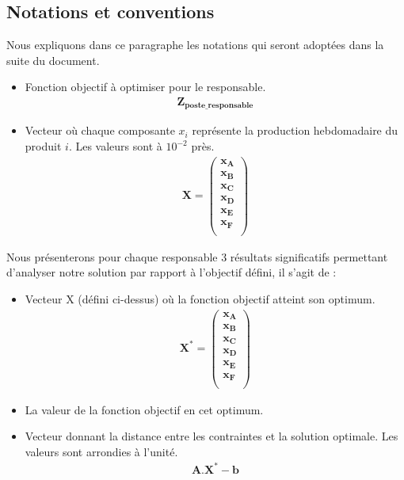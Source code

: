 \documentclass[12pt]{article}
\begin{document}
\subsection{Notations et conventions}
Nous expliquons dans ce paragraphe les notations qui seront adoptées dans la suite du document.
\begin{itemize}
\item Fonction objectif à optimiser pour le responsable.
\begin{align*} 
	\boldsymbol{Z_{poste\_responsable}}
\end{align*}
\item Vecteur où chaque composante $x_{i}$ représente la production hebdomadaire du produit $i$. Les valeurs sont à $10^{-2}$ près.
\begin{align*} 
	\boldsymbol{X = 
   \left (
   \begin{array}{c}
      x_{A} \\
      x_{B} \\
      x_{C} \\
      x_{D} \\
      x_{E} \\
      x_{F} \\
   \end{array}
   \right )}
\end{align*}
\end{itemize}
Nous présenterons pour chaque responsable 3 résultats significatifs permettant d'analyser notre solution par rapport à l'objectif défini, il s'agit de :
\begin{itemize}
\item Vecteur X (défini ci-dessus) où la fonction objectif atteint son optimum.
\begin{align*}
\boldsymbol{X^{*} = 
   \left (
   \begin{array}{c}
      x_{A} \\
      x_{B} \\
      x_{C} \\
      x_{D} \\
      x_{E} \\
      x_{F} \\
   \end{array}
   \right )}
 \end{align*}
 \item La valeur de la fonction objectif en cet optimum.
 \item Vecteur donnant la distance entre les contraintes et la solution optimale. Les valeurs sont arrondies à l'unité.
 \begin{align*} 
 \boldsymbol{A.X^{*}-b}
 \end{align*}
\end{itemize}
\end{document}
